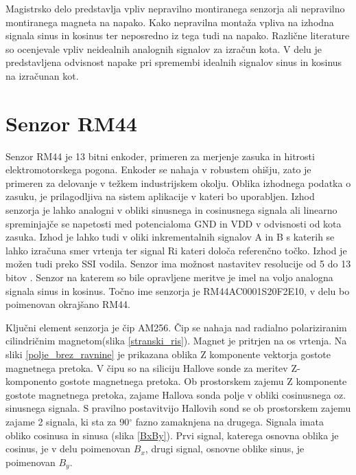 Magistrsko delo predstavlja vpliv nepravilno montiranega senzorja ali nepravilno montiranega magneta na napako. Kako nepravilna montaža vpliva na izhodna signala sinus in kosinus ter neposredno iz tega tudi na napako.
Različne literature so ocenjevale vpliv neidealnih analognih signalov za izračun kota\cite{osnova}\cite{RLS1}\cite{RLS2}. V delu je predstavljena odvisnost napake pri spremembi idealnih signalov sinus in kosinus na izračunan kot.




\chapter{Senzor RM44}

Senzor RM44 je 13 bitni enkoder, primeren za merjenje zasuka in hitrosti elektromotorskega pogona\cite{RM44}.
Enkoder se nahaja v robustem ohišju, zato je primeren za delovanje v težkem industrijskem okolju. %
Oblika izhodnega podatka o zasuku, je prilagodljiva na sistem aplikacije v kateri bo uporabljen\cite{Ambrozic}. Izhod senzorja je lahko analogni v obliki sinusnega in cosinusnega signala ali linearno spreminjajče se napetosti med potencialoma GND in VDD v odvisnosti od kota zasuka.
Izhod je lahko tudi v oliki inkrementalnih signalov A in B s katerih se lahko izračuna smer vrtenja ter signal Ri kateri določa referenčno točko. Izhod je možen tudi preko SSI vodila. Senzor ima možnost nastavitev resolucije od 5 do 13 bitov \cite{AM8192}\cite{RM44}. Senzor na katerem so bile opravljene meritve je imel na voljo analogna signala sinus in kosinus. Točno ime senzorja je RM44AC0001S20F2E10, v delu bo poimenovan okrajšano RM44.

Ključni element senzorja je čip AM256. Čip se nahaja nad radialno polariziranim cilindričnim magnetom(slika \ref{stranski_ris}). Magnet je pritrjen na os vrtenja. Na sliki \ref{polje_brez_ravnine}  je prikazana oblika Z komponente vektorja gostote magnetnega pretoka. V čipu so na siliciju Hallove sonde za meritev Z-komponento gostote magnetnega pretoka. Ob prostorskem zajemu Z komponente gostote magnetnega pretoka, zajame Hallova sonda polje v obliki cosinusnega oz. sinusnega signala. S pravilno postavitvijo Hallovih sond se ob prostorskem zajemu zajame 2 signala, ki sta za 90$^\circ$ fazno zamaknjena na drugega. Signala imata obliko cosinusa in sinusa (slika \ref{BxBy}). Prvi signal, katerega osnovna oblika je cosinus, je v delu poimenovan $B_x$, drugi signal, osnovne oblike sinus, je poimenovan $B_y$.

